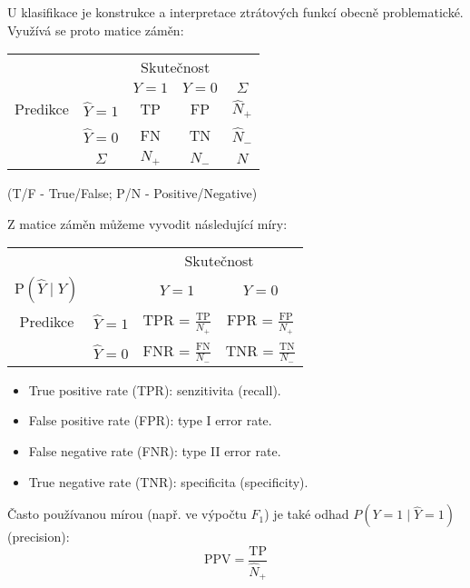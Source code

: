 \documentclass[../main.tex]{subfiles}
\begin{document}
U klasifikace je konstrukce a interpretace ztrátových funkcí obecně problematické. Využívá se proto matice záměn:
{\def\arraystretch{1.5}
\begin{center}
    \begin{tabular}{ c c | c c | c }
                 &               & \multicolumn{2}{c|}{Skutečnost}                       \\
                 &               & $Y = 1$                         & $Y=0$ & $\Sigma$    \\
        \hline
        Predikce & $\hat{Y} = 1$ & TP                              & FP    & $\hat{N}_+$ \\
                 & $\hat{Y} = 0$ & FN                              & TN    & $\hat{N}_-$ \\
        \hline
                 & $\Sigma$      & $N_+$                           & $N_-$ & $N$
    \end{tabular}
\end{center}}
(T/F - True/False; P/N - Positive/Negative)

Z matice záměn můžeme vyvodit následující míry:
{\def\arraystretch{2}
\begin{center}
    \begin{tabular}{ c c | c c }
                                   &               & \multicolumn{2}{c}{Skutečnost}                                 \\
        $\text{P}(\hat{Y} \mid Y)$ &               & $Y = 1$                        & $Y=0$                         \\
        \hline
        Predikce                   & $\hat{Y} = 1$ & TPR = $\frac{\text{TP}}{N_+}$  & FPR = $\frac{\text{FP}}{N_+}$ \\
                                   & $\hat{Y} = 0$ & FNR = $\frac{\text{FN}}{N_-}$  & TNR = $\frac{\text{TN}}{N_-}$ \\
    \end{tabular}
\end{center}}
\begin{itemize}
    \item True positive rate (TPR): senzitivita (recall).
    \item False positive rate (FPR): type I error rate.
    \item False negative rate (FNR): type II error rate.
    \item True negative rate (TNR): specificita (specificity).
\end{itemize}
Často používanou mírou (např. ve výpočtu $F_1$) je také odhad $P(Y = 1 \mid \hat{Y} = 1)$ (precision):
\[\text{PPV} = \frac{\text{TP}}{\hat{N}_+}\]
\end{document}
